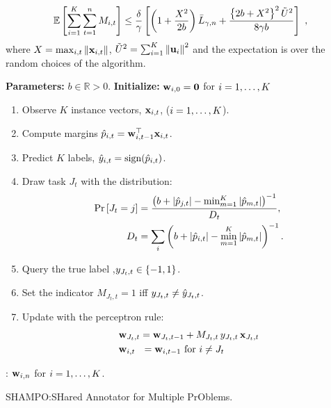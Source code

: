 {\begin{theorem}
\begin{equation}\label{eq:bound_FO_SHAMPO}
\mathbb{E}\left[ \sum_{i=1}^{K}\sum_{t=1}^{n}{M_{i,t}} \right]
\le \frac{\delta}{\gamma}\left[{\left(1+\frac{X^2}{2b} \right){\bar L}_{\gamma,n}
+\frac{\left\{{2b+X^2}\right\}^2\tilde{U}^2}{8{\gamma}b}}\right]~,
\end{equation}
 where $X=\max_{i,t}\Vert\mathbf{x}_{i,t}\Vert$,
$\tilde{U}^2=\sum_{i=1}^{K}\left\Vert {\mathbf{u}_{i}} \right\Vert^2$ and the expectation is over the
random choices of the algorithm.
\end{theorem} \label{thm:FO_theorem}

\begin{algorithm}[h]
\begin{algorithmic}
   \State \textbf{Parameters:}  $b\in\mathbb{R}>0$.
   \State \textbf{Initialize:} $\mathbf{w}_{i,0}={\boldsymbol{0}}$ for $i=1, \ldots , K$\\
\begin{enumerate}
\nolineskips
\item Observe $K$ instance vectors, $\mathbf{x}_{i,t}$, ($i=1 , \ldots , K$).
\item Compute margins $\hat{p}_{i,t}={\mathbf{w}}^{\top}_{i,t-1} \mathbf{x}_{i,t}$.
\item Predict $K$ labels, $\hat{y}_{i,t}={\rm sign}(\hat{p}_{i,t})$.
\item Draw task $J_t$  with the distribution:
\begin{align}
{\rm Pr}\left[{J_t=j}\right] &=
\frac{\left({b+\left\vert{\hat{p}_{j,t}}\right\vert-\min_{m=1}^K\left\vert{\hat{p}_{m,t}}\right\vert}\right)^{-1}}{D_{t}}, \nonumber\\
D_t &=
\sum_i \left({b+\left\vert{\hat{p}_{i,t}}\right\vert-\min_{m=1}^K\left\vert{\hat{p}_{m,t}}\right\vert}\right)^{-1}. \nonumber
\end{align}
\item Query the true label ,$y_{J_t,t}\in\{-1,1\}$.
\item Set the indicator $M_{J_t, t}=1$ iff $y_{J_t,t} \neq \hat{y}_{J_t,t}$.
\item Update with the perceptron rule:
\begin{align}
&\mathbf{w}_{J_t,t} = \mathbf{w}_{J_t,t-1}+M_{J_t,t} \, y_{J_t,t}\, \mathbf{x}_{J_t,t}\label{eq:update_rule} \\
&\mathbf{w}_{i,t} ~~= \mathbf{w}_{i,t-1}  \textrm{ for } i \neq J_t \nonumber
\end{align}
\end{enumerate}
   \EndFor  
   : $\mathbf{w}_{i,n}$ for $i=1 , \ldots , K$.
\end{algorithmic}
\caption{SHAMPO:\@ SHared Annotator for Multiple PrOblems.}\label{alg:SHAMPO_FO}
\end{algorithm}

}
